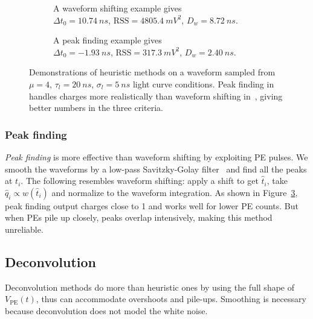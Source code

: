 \begin{figure}[H]
  \begin{subfigure}{.5\textwidth}
    \centering
    \resizebox{\textwidth}{!}{}
    \caption{\label{fig:shifting} A waveform shifting example gives \\ $\Delta t_0=\SI{10.74}{ns}$, $\mathrm{RSS}=\SI{4805.4}{mV^2}$, $D_w=\SI{8.72}{ns}$.}
  \end{subfigure}
  \begin{subfigure}{.5\textwidth}
    \centering
    \resizebox{\textwidth}{!}{}
    \caption{\label{fig:peak} A peak finding example gives \\ $\Delta t_0=\SI{-1.93}{ns}$, $\mathrm{RSS}=\SI{317.3}{mV^2}$, $D_w=\SI{2.40}{ns}$.}
  \end{subfigure}
  \caption{Demonstrations of heuristic methods on a waveform sampled from $\mu=4$, $\tau_l=\SI{20}{ns}$, $\sigma_l=\SI{5}{ns}$ light curve conditions.  Peak finding in~ handles charges more realistically than waveform shifting in~, giving better numbers in the three criteria.}
\end{figure}

\subsubsection{Peak finding}
\label{sec:findpeak}

\textit{Peak finding} is more effective than waveform shifting by exploiting PE pulses.  We smooth the waveforms by a low-pass Savitzky-Golay filter~\cite{savitzky_smoothing_1964} and find all the peaks at $t_i$.  The following resembles waveform shifting: apply a shift to get $\hat{t}_i$, take $\hat{q}_i \propto w(\hat{t}_i)$ and normalize to the waveform integration. As shown in Figure~\ref{fig:peak}, peak finding output charges close to 1 and works well for lower PE counts.  But when PEs pile up closely, peaks overlap intensively, making this method unreliable.

\subsection{Deconvolution}
\label{sec:deconv}
Deconvolution methods do more than heuristic ones by using the full shape of $V_\mathrm{PE}(t)$, thus can accommodate overshoots and pile-ups.  Smoothing is necessary because deconvolution does not model the white noise.


